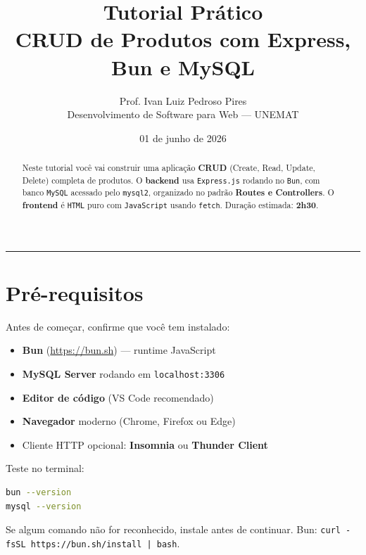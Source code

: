 \documentclass[11pt,a4paper]{article}
\title{\vspace{-1.5cm}
  \color{azul}\Huge Tutorial Prático\\
  \LARGE CRUD de Produtos com Express, Bun e MySQL
}
\author{\large Prof. Ivan Luiz Pedroso Pires\\\small Desenvolvimento de Software para Web --- UNEMAT}
\date{\large 01 de junho de 2026}
\begin{document}
\maketitle
\thispagestyle{fancy}

\begin{abstract}
\noindent Neste tutorial você vai construir uma aplicação \textbf{CRUD} (Create, Read, Update, Delete) completa de produtos. O \textbf{backend} usa \texttt{Express.js} rodando no \texttt{Bun}, com banco \texttt{MySQL} acessado pelo \texttt{mysql2}, organizado no padrão \textbf{Routes e Controllers}. O \textbf{frontend} é \texttt{HTML} puro com \texttt{JavaScript} usando \texttt{fetch}. Duração estimada: \textbf{2h30}.
\end{abstract}

\tableofcontents
\vspace{0.5cm}
\hrule
\vspace{0.5cm}

\section{Pré-requisitos}

Antes de começar, confirme que você tem instalado:

\begin{itemize}[leftmargin=*, itemsep=2pt]
  \item \textbf{Bun} (\url{https://bun.sh}) --- runtime JavaScript
  \item \textbf{MySQL Server} rodando em \texttt{localhost:3306}
  \item \textbf{Editor de código} (VS Code recomendado)
  \item \textbf{Navegador} moderno (Chrome, Firefox ou Edge)
  \item Cliente HTTP opcional: \textbf{Insomnia} ou \textbf{Thunder Client}
\end{itemize}

Teste no terminal:

\begin{lstlisting}[language=bash]
bun --version
mysql --version
\end{lstlisting}

\begin{caixa-atencao}
Se algum comando não for reconhecido, instale antes de continuar. Bun: \texttt{curl -fsSL https://bun.sh/install | bash}.
\end{caixa-atencao}
\end{document}
